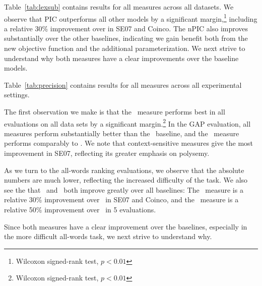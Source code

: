 \hardline
Table~\ref{tab:lexsub} contains results for all measures across all datasets.
We observe that PIC outperforms all other models by a significant
margin,\footnote{Wilcoxon signed-rank test, $p < 0.01$} including a relative
30\% improvement over \balAddCos in SE07 and Coinco. The nPIC also improves
substantially over the other baselines, indicating we gain benefit both from
the new objective function and the additional parameterization.  We next
strive to understand why both measures have a clear improvements over the
baseline models.
\hardline

Table~\ref{tab:precision} contains results for all measures across all
experimental settings.

The first observation we make is that the \ourmeasparam~measure performs best
in all evaluations on all data sets by a significant margin.\footnote{Wilcoxon signed-rank test, $p < 0.01$}
In the GAP evaluation, all measures
perform substantially better than the \ooc~baseline, and the \ourmeas~measure
performs comparably to \balAddCos. We note that context-sensitive
measures give the most improvement in SE07, reflecting its greater emphasis on
polysemy.

As we turn to the all-words ranking evaluations, we observe that the absolute numbers are
much lower, reflecting the increased difficulty of the task. We also see the
that \ourmeas~and \ourmeasparam~both improve greatly over all baselines: The
\ourmeas~measure is a relative 30\% improvement over \balAddCos~in SE07 and
Coinco, and the \ourmeasparam~measure is a relative 50\% improvement over
\balAddCos~in 5 evaluations.

Since both measures have a clear improvement over the baselines, especially in
the more difficult all-words task, we next strive to understand why.


